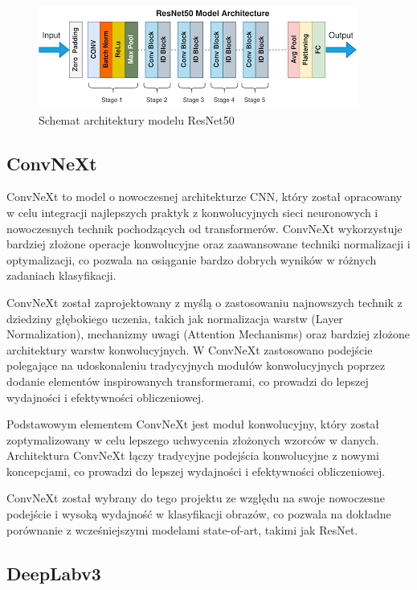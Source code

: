 \begin{figure}
	\centering\includegraphics[width=.9\textwidth]{img/resnet.png}
	\caption{Schemat architektury modelu ResNet50}  \label{rys:resnet}
\end{figure}

\subsection*{ConvNeXt}

ConvNeXt to model o nowoczesnej architekturze CNN, który został opracowany w celu integracji najlepszych praktyk z konwolucyjnych sieci neuronowych i nowoczesnych technik pochodzących od transformerów. ConvNeXt wykorzystuje bardziej złożone 
operacje konwolucyjne oraz zaawansowane techniki normalizacji i optymalizacji, co pozwala na osiąganie bardzo dobrych wyników w różnych zadaniach klasyfikacji.

ConvNeXt został zaprojektowany z myślą o zastosowaniu najnowszych technik z dziedziny głębokiego uczenia, takich jak normalizacja warstw (Layer Normalization), mechanizmy uwagi (Attention Mechanisms) oraz bardziej złożone architektury 
warstw konwolucyjnych. W ConvNeXt zastosowano podejście polegające na udoskonaleniu tradycyjnych modułów konwolucyjnych poprzez dodanie elementów inspirowanych transformerami, co prowadzi do lepszej wydajności i efektywności obliczeniowej.

Podstawowym elementem ConvNeXt jest moduł konwolucyjny, który został zoptymalizowany w celu lepszego uchwycenia złożonych wzorców w danych. Architektura ConvNeXt łączy tradycyjne podejścia konwolucyjne z nowymi koncepcjami, co 
prowadzi do lepszej wydajności i efektywności obliczeniowej.

ConvNeXt został wybrany do tego projektu ze względu na swoje nowoczesne podejście i wysoką wydajność w klasyfikacji obrazów, co pozwala na dokładne porównanie z wcześniejszymi modelami state-of-art, takimi jak ResNet.

\subsection*{DeepLabv3}

